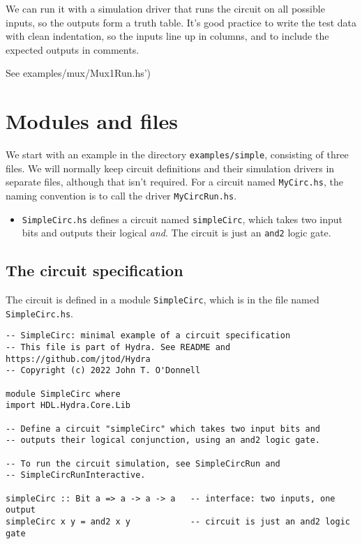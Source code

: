 \documentclass[11pt]{article}
\begin{document}
We can run it with a simulation driver that runs the circuit on all
possible inputs, so the outputs form a truth table.  It's good
practice to write the test data with clean indentation, so the inputs
line up in columns, and to include the expected outputs in comments.

See examples/mux/Mux1Run.hs')


\section{Modules and files}
\label{sec:orgbbef9ab}

We start with an example in the directory \texttt{examples/simple},
consisting of three files.  We will normally keep circuit definitions
and their simulation drivers in separate files, although that isn't
required.  For a circuit named \texttt{MyCirc.hs}, the naming convention is
to call the driver \texttt{MyCircRun.hs}.

\begin{itemize}
\item \texttt{SimpleCirc.hs} defines a circuit named \texttt{simpleCirc}, which takes
two input bits and outputs their logical \emph{and}.  The circuit is just
an \texttt{and2} logic gate.
\end{itemize}

\subsection{The circuit specification}
\label{sec:org6c2f143}

The circuit is defined in a module \texttt{SimpleCirc}, which is in the file
named \texttt{SimpleCirc.hs}.

\begin{verbatim}
-- SimpleCirc: minimal example of a circuit specification
-- This file is part of Hydra. See README and https://github.com/jtod/Hydra
-- Copyright (c) 2022 John T. O'Donnell

module SimpleCirc where
import HDL.Hydra.Core.Lib

-- Define a circuit "simpleCirc" which takes two input bits and
-- outputs their logical conjunction, using an and2 logic gate.

-- To run the circuit simulation, see SimpleCircRun and
-- SimpleCircRunInteractive.

simpleCirc :: Bit a => a -> a -> a   -- interface: two inputs, one output
simpleCirc x y = and2 x y            -- circuit is just an and2 logic gate
\end{verbatim}
\end{document}
